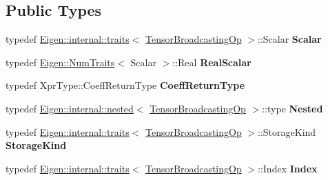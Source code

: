 \subsection*{Public Types}
\begin{DoxyCompactItemize}
\item 
\mbox{\label{class_eigen_1_1_tensor_broadcasting_op_acf127f0354bf98e775c77bb17ac86c03}} 
typedef \hyperlink{struct_eigen_1_1internal_1_1traits}{Eigen\+::internal\+::traits}$<$ \hyperlink{class_eigen_1_1_tensor_broadcasting_op}{Tensor\+Broadcasting\+Op} $>$\+::Scalar {\bfseries Scalar}
\item 
\mbox{\label{class_eigen_1_1_tensor_broadcasting_op_a3a22547605f3f513e7c76e59b981e846}} 
typedef \hyperlink{group___core___module_struct_eigen_1_1_num_traits}{Eigen\+::\+Num\+Traits}$<$ Scalar $>$\+::Real {\bfseries Real\+Scalar}
\item 
\mbox{\label{class_eigen_1_1_tensor_broadcasting_op_a2b7ba94ba6888c9d6fa505b275ee7c11}} 
typedef Xpr\+Type\+::\+Coeff\+Return\+Type {\bfseries Coeff\+Return\+Type}
\item 
\mbox{\label{class_eigen_1_1_tensor_broadcasting_op_a9a159528a24b1ca9a22419ce9b480115}} 
typedef \hyperlink{struct_eigen_1_1internal_1_1nested}{Eigen\+::internal\+::nested}$<$ \hyperlink{class_eigen_1_1_tensor_broadcasting_op}{Tensor\+Broadcasting\+Op} $>$\+::type {\bfseries Nested}
\item 
\mbox{\label{class_eigen_1_1_tensor_broadcasting_op_aff1a9feaec09fec9a62cf53b0cbc8cc5}} 
typedef \hyperlink{struct_eigen_1_1internal_1_1traits}{Eigen\+::internal\+::traits}$<$ \hyperlink{class_eigen_1_1_tensor_broadcasting_op}{Tensor\+Broadcasting\+Op} $>$\+::Storage\+Kind {\bfseries Storage\+Kind}
\item 
\mbox{\label{class_eigen_1_1_tensor_broadcasting_op_a3a43eb51a2c130c12909f205a1bc42bf}} 
typedef \hyperlink{struct_eigen_1_1internal_1_1traits}{Eigen\+::internal\+::traits}$<$ \hyperlink{class_eigen_1_1_tensor_broadcasting_op}{Tensor\+Broadcasting\+Op} $>$\+::Index {\bfseries Index}

\end{DoxyCompactItemize}
